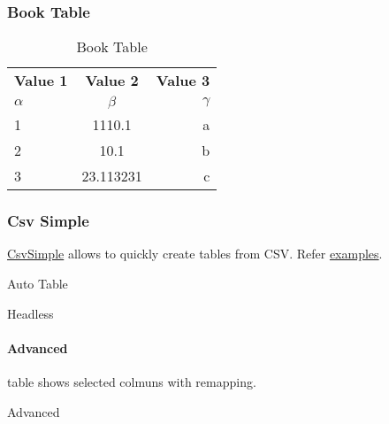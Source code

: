 \documentclass{report}[a4paper,12pt] %
\begin{document}
\newpage
\subsubsection{Book Table}
\begin{table}[h!]
  \centering
  \caption{Book Table}
  \label{tab:book}
  \begin{tabular}{@{}lcr@{}} %
    \toprule %
    \textbf{Value 1} & \textbf{Value 2} & \textbf{Value 3}\\
    $\alpha$ & $\beta$ & $\gamma$ \\
    \midrule %
    1 & 1110.1 & a\\
    2 & 10.1 & b\\
    3 & 23.113231 & c\\
    \bottomrule %
  \end{tabular}
\end{table}

\subsubsection{Csv Simple}
\href{https://www.ctan.org/pkg/csvsimple}{CsvSimple} allows to quickly create tables from CSV.
Refer \href{https://github.com/T-F-S/csvsimple/blob/master/doc/latex/csvsimple/csvsimple-example.tex}{examples}.

\begin{table}[h!]
    \centering
    \caption{Auto Table}
\end{table}

\begin{table}[h!]
  \centering
  \caption{Headless}
\end{table}

\paragraph{Advanced} table shows selected colmuns with remapping.
\begin{table}[h!]
  \centering
  \caption{Advanced}
\end{table}
\end{document}
